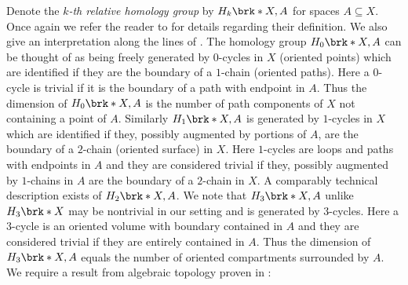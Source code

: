 Denote the \emph{$k$-th relative homology group} by $H_k\brk*{X,A}$ for spaces $A\subseteq X$.
Once again we refer the reader to \cite[Chapter 2]{Hatcher2002} for details regarding their definition.
We also give an interpretation along the lines of \cite{Cantarella2002}.
The homology group $H_0\brk*{X,A}$ can be thought of as being freely generated by $0$-cycles in $X$ (oriented points)
which are identified if they are the boundary of a $1$-chain (oriented paths).
Here a $0$-cycle is trivial if it is the boundary of a path with endpoint in $A$.
Thus the dimension of $H_0\brk*{X,A}$ is the number of path components of $X$ not containing a point of $A$.
Similarly $H_1\brk*{X,A}$ is generated by $1$-cycles in $X$ which are identified if they, possibly augmented by 
portions of $A$, are the boundary of a $2$-chain (oriented surface) in $X$.
Here $1$-cycles are loops and paths with endpoints in $A$ and they are considered trivial if they, possibly augmented by $1$-chains in $A$ are the boundary
of a $2$-chain in $X$.
A comparably technical description exists of $H_2\brk*{X,A}$.
We note that $H_3\brk*{X,A}$ unlike $H_3\brk*{X}$ may be nontrivial in our setting and is generated by $3$-cycles.
Here a $3$-cycle is an oriented volume with boundary contained in $A$ and they are considered trivial if
they are entirely contained in $A$.
Thus the dimension of $H_3\brk*{X,A}$ equals the number of oriented compartments surrounded by $A$.
%
We require a result from algebraic topology proven in \cite[Corollary 2.24]{Hatcher2002}:
